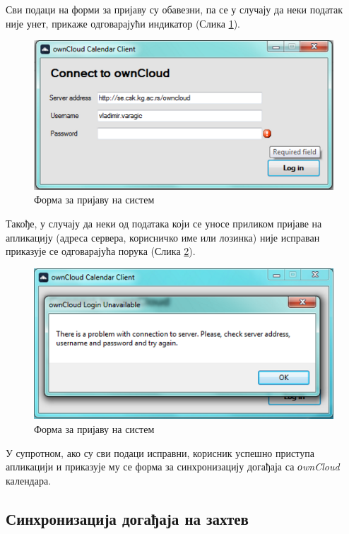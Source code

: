 Сви подаци на форми за пријаву су обавезни, па се у случају да неки податак није унет, прикаже одговарајући индикатор (Слика \ref{fig:login_form_required}).

\begin{figure}[H]
	\centering
	\includegraphics[scale=0.5]{slike/LogInFormReqiredFields.png}
	\caption{Форма за пријаву на систем}
	\label{fig:login_form_required}
\end{figure}

Такође, у случају да неки од података који се уносе приликом пријаве на апликацију (адреса сервера, корисничко име или лозинка) није исправан приказује се одговарајућа порука (Слика \ref{fig:login_form_failed}).

\begin{figure}[H]
	\centering
	\includegraphics[scale=0.5]{slike/logInFailed.png}
	\caption{Форма за пријаву на систем}
	\label{fig:login_form_failed}
\end{figure}

У супротном, ако су сви подаци исправни, корисник успешно приступа апликацији и приказује му се форма за синхронизацију догађаја са \textit{оwnCloud} календара.

\subsection{Синхронизација догађаја на захтев}

